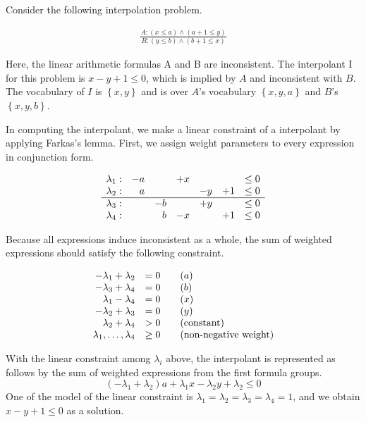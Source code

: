 Consider the following interpolation problem.

\begin{align*}
\frac
{A: (x \leq a) \wedge (a + 1 \leq y)}
{B: (y \leq b) \wedge (b + 1 \leq x)}
\end{align*}

Here, the linear arithmetic formulas A and B are inconsistent.  The
interpolant I for this problem is $x-y+1 \leq 0$, which is implied by
$A$ and inconsistent with $B$.  The vocabulary of $I$ is $\left\lbrace
x,y \right\rbrace$ and is over $A$'s vocabulary $\left\lbrace x,y,a
\right\rbrace$ and $B$'s $\left\lbrace x,y,b \right\rbrace$.

In computing the interpolant, we make a linear constraint of a
interpolant by applying Farkas's lemma.  First, we assign weight
parameters to every expression in conjunction form.

\begin{align*}
\begin{array}{r r r r r r l}
\lambda_1 : & -a & & +x & & & \leq 0 \\
\lambda_2 : & a & & & -y & +1 & \leq 0 \\
\hline
\lambda_3 : & & -b & & +y & & \leq 0 \\
\lambda_4 : & & b & -x & & +1 & \leq 0
\end{array}
\end{align*}

Because all expressions induce inconsistent as a whole, the sum of
weighted expressions should satisfy the following constraint.

\begin{align*}
\begin{array}{r l l}
- \lambda_1 + \lambda_2 & = 0 \quad & (a) \\
- \lambda_3 + \lambda_4 & = 0 & (b) \\
  \lambda_1 - \lambda_4 & = 0 & (x) \\
- \lambda_2 + \lambda_3 & = 0 & (y) \\
  \lambda_2 + \lambda_4 & > 0 & (\text{constant}) \\
\lambda_1, \ldots, \lambda_4 & \geq 0 & (\text{non-negative weight})
\end{array}
\end{align*}

With the linear constraint among $\lambda_i$ above, the interpolant is
represented as follows by the sum of weighted expressions from the
first formula groups.
\[ (- \lambda_1 + \lambda_2) a + \lambda_1 x - \lambda_2 y + \lambda_2 \leq 0 \]
One of the model of the linear constraint is $\lambda_1 = \lambda_2 =
\lambda_3 = \lambda_4 = 1$, and we obtain $x-y+1 \leq 0$ as a
solution.

